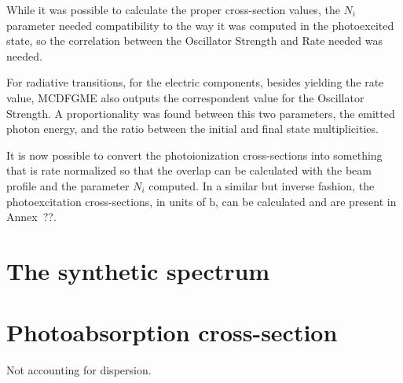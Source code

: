 
While it was possible to calculate the proper cross-section values, the $N_i$ parameter needed compatibility to the way it was computed in the photoexcited state, so the correlation between the Oscillator Strength and Rate needed was needed.


For radiative transitions, for the electric components, besides yielding the rate value, \gls{MCDFGME} also outputs the correspondent value for the Oscillator Strength. A proportionality was found between this two parameters, the emitted photon energy, and the ratio between the initial and final state multiplicities.


It is now possible to convert the photoionization cross-sections into something that is rate normalized so that the overlap can be calculated with the beam profile and the parameter $N_i$ computed. In a similar but inverse fashion, the photoexcitation cross-sections, in units of $\si{\barn}$, can be calculated and are present in Annex~??.


\section{The synthetic spectrum}



\section{Photoabsorption cross-section}
Not accounting for dispersion.